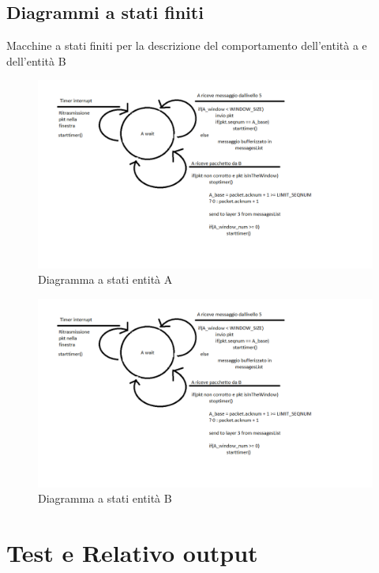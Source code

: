 \documentclass[a4paper]{article}
\begin{document}
\subsection{Diagrammi a stati finiti}
Macchine a stati finiti per la descrizione del comportamento dell'entità a e dell'entità B
\begin{figure}[h!]
\includegraphics[scale = 0.50]{Assigment3.png}
\caption{Diagramma a stati entità A}
\end{figure}
\newline
\begin{figure}[h!]
\includegraphics[scale = 0.50]{Assigment3.png}
\caption{Diagramma a stati entità B}
\end{figure}

\section{Test e Relativo output}
\end{document}
